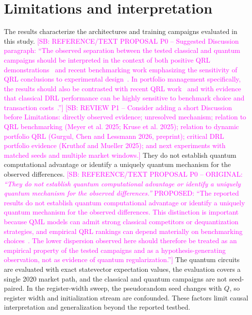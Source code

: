 \documentclass[aps,floatfix,superscriptaddress,twocolumn,tightenlines,amsmath,amssymb,nofootinbib,10pt,longbibliography,prl]{revtex4-2}
\newcommand{\sam}[1]{\textcolor{magenta}{[SB: {#1}]}}
\begin{document}
\section{Limitations and interpretation}
\label{sec:limitations}

The results characterize the architectures and training campaigns evaluated in this study.
\sam{REFERENCE/TEXT PROPOSAL P0 -- Suggested Discussion paragraph: ``The observed separation between the tested classical and quantum campaigns should be interpreted in the context of both positive QRL demonstrations~\cite{Jerbi2021ParametrizedQuantumP,Skolik2022QuantumagentsintheGy,Sequeira2023Policygradientsusing} and recent benchmarking work emphasizing the sensitivity of QRL conclusions to experimental design~\cite{Meyer2025BenchmarkingQuantumR,Kruse2025BenchmarkingQuantumRL}. In portfolio management specifically, the results should also be contrasted with recent QRL work~\cite{Gurgul2026QRLPortfolio} and with evidence that classical DRL performance can be highly sensitive to benchmark choice and transaction costs~\cite{Kruthof2025CanDRLBeat1N}.''}
\sam{REVIEW P1 -- Consider adding a short Discussion before Limitations: directly observed evidence; unresolved mechanism; relation to QRL benchmarking (Meyer et al. 2025; Kruse et al. 2025); relation to dynamic portfolio QRL (Gurgul, Chen and Lessmann 2026, preprint); critical DRL portfolio evidence (Kruthof and Mueller 2025); and next experiments with matched seeds and multiple market windows.} They do not establish quantum computational advantage or identify a uniquely quantum mechanism for the observed differences.
\sam{REFERENCE/TEXT PROPOSAL P0 -- ORIGINAL: \textit{``They do not establish quantum computational advantage or identify a uniquely quantum mechanism for the observed differences.''} PROPOSED: ``The reported results do not establish quantum computational advantage or identify a uniquely quantum mechanism for the observed differences. This distinction is important because QML models can admit strong classical competitors or dequantization strategies, and empirical QRL rankings can depend materially on benchmarking choices~\cite{Tang2022Dequantizingalgori,Shin2024Dequantizingquantu,Meyer2025BenchmarkingQuantumR,Kruse2025BenchmarkingQuantumRL}. The lower dispersion observed here should therefore be treated as an empirical property of the tested campaigns and as a hypothesis-generating observation, not as evidence of quantum regularization.''} The quantum circuits are evaluated with exact statevector expectation values, the evaluation covers a single 2020 market path, and the classical and quantum campaigns are not seed-paired. In the register-width sweep, the pseudorandom seed changes with $Q$, so register width and initialization stream are confounded. These factors limit causal interpretation and generalization beyond the reported testbed.
\end{document}

